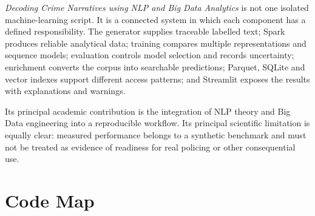\documentclass[12pt,a4paper]{report}
\newcommand{\project}{\textit{Decoding Crime Narratives using NLP and Big Data Analytics}}
\begin{document}
\project{} is not one isolated machine-learning script. It is a connected system in which each component has a defined responsibility. The generator supplies traceable labelled text; Spark produces reliable analytical data; training compares multiple representations and sequence models; evaluation controls model selection and records uncertainty; enrichment converts the corpus into searchable predictions; Parquet, SQLite and vector indexes support different access patterns; and Streamlit exposes the results with explanations and warnings.

Its principal academic contribution is the integration of NLP theory and Big Data engineering into a reproducible workflow. Its principal scientific limitation is equally clear: measured performance belongs to a synthetic benchmark and must not be treated as evidence of readiness for real policing or other consequential use.

\appendix
\chapter{Code Map}
\end{document}
